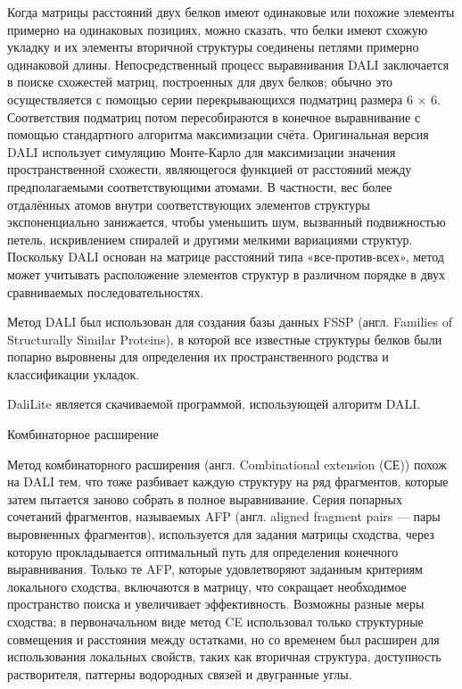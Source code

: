 \documentclass[a4paper]{extreport}
\begin{document}
Когда матрицы расстояний двух белков имеют одинаковые или похожие элементы примерно на одинаковых позициях, можно сказать, что белки имеют схожую укладку и их элементы вторичной структуры соединены петлями примерно одинаковой длины. Непосредственный процесс выравнивания DALI заключается в поиске схожестей матриц, построенных для двух белков; обычно это осуществляется с помощью серии перекрывающихся подматриц размера 6 $\times$ 6. Соответствия подматриц потом пересобираются в конечное выравнивание с помощью стандартного алгоритма максимизации счёта. Оригинальная версия DALI использует симуляцию Монте-Карло для максимизации значения пространственной схожести, являющегося функцией от расстояний между предполагаемыми соответствующими атомами. В частности, вес более отдалённых атомов внутри соответствующих элементов структуры экспоненциально занижается, чтобы уменьшить шум, вызванный подвижностью петель, искривлением спиралей и другими мелкими вариациями структур. Поскольку DALI основан на матрице расстояний типа «все-против-всех», метод может учитывать расположение элементов структур в различном порядке в двух сравниваемых последовательностях.

Метод DALI был использован для создания базы данных FSSP (англ. Families of Structurally Similar Proteins), в которой все известные структуры белков были попарно выровнены для определения их пространственного родства и классификации укладок.

DaliLite является скачиваемой программой, использующей алгоритм DALI.

Комбинаторное расширение

Метод комбинаторного расширения (англ. Combinational extension (СЕ)) похож на DALI тем, что тоже разбивает каждую структуру на ряд фрагментов, которые затем пытается заново собрать в полное выравнивание. Серия попарных сочетаний фрагментов, называемых AFP (англ. aligned fragment pairs — пары выровненных фрагментов), используется для задания матрицы сходства, через которую прокладывается оптимальный путь для определения конечного выравнивания. Только те AFP, которые удовлетворяют заданным критериям локального сходства, включаются в матрицу, что сокращает необходимое пространство поиска и увеличивает эффективность. Возможны разные меры сходства; в первоначальном виде метод CE использовал только структурные совмещения и расстояния между остатками, но со временем был расширен для использования локальных свойств, таких как вторичная структура, доступность растворителя, паттерны водородных связей и двугранные углы.
\end{document}
